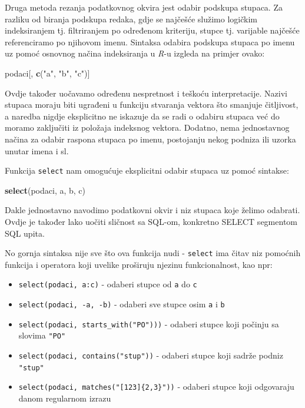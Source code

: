 \documentclass[]{book}
\newenvironment{Shaded}{\begin{snugshade}}{\end{snugshade}}
\newcommand{\KeywordTok}[1]{\textcolor[rgb]{0.13,0.29,0.53}{\textbf{#1}}}
\newcommand{\StringTok}[1]{\textcolor[rgb]{0.31,0.60,0.02}{#1}}
\newcommand{\NormalTok}[1]{#1}
\providecommand{\tightlist}{%
  \setlength{\itemsep}{0pt}\setlength{\parskip}{0pt}}
\theoremstyle{definition}
\theoremstyle{definition}
\theoremstyle{definition}
\theoremstyle{remark}
\begin{document}
Druga metoda rezanja podatkovnog okvira jest odabir podskupa stupaca. Za
razliku od biranja podskupa redaka, gdje se najčešće služimo logičkim
indeksiranjem tj. filtriranjem po određenom kriteriju, stupce tj.
varijable najčešće referenciramo po njihovom imenu. Sintaksa odabira
podskupa stupaca po imenu uz pomoć osnovnog načina indeksiranja u
\emph{R}-u izgleda na primjer ovako:

\begin{Shaded}
\begin{Highlighting}[]
\NormalTok{podaci[, }\KeywordTok{c}\NormalTok{(}\StringTok{"a"}\NormalTok{, }\StringTok{"b"}\NormalTok{, }\StringTok{"c"}\NormalTok{)]}
\end{Highlighting}
\end{Shaded}

Ovdje također uočavamo određenu nespretnost i teškoću interpretacije.
Nazivi stupaca moraju biti ugrađeni u funkciju stvaranja vektora što
smanjuje čitljivost, a naredba nigdje eksplicitno ne iskazuje da se radi
o odabiru stupaca već do moramo zaključiti iz položaja indeksnog
vektora. Dodatno, nema jednostavnog načina za odabir raspona stupaca po
imenu, postojanju nekog podniza ili uzorka unutar imena i sl.

Funkcija \texttt{select} nam omogućuje eksplicitni odabir stupaca uz
pomoć sintakse:

\begin{Shaded}
\begin{Highlighting}[]
\KeywordTok{select}\NormalTok{(podaci, a, b, c)}
\end{Highlighting}
\end{Shaded}

Dakle jednostavno navodimo podatkovni okvir i niz stupaca koje želimo
odabrati. Ovdje je također lako uočiti sličnost sa SQL-om, konkretno
SELECT segmentom SQL upita.

No gornja sintaksa nije sve što ova funkcija nudi - \texttt{select} ima
čitav niz pomoćnih funkcija i operatora koji uvelike proširuju njezinu
funkcionalnost, kao npr:

\begin{itemize}
\tightlist
\item
  \texttt{select(podaci,\ a:c)} - odaberi stupce od \texttt{a} do
  \texttt{c}
\item
  \texttt{select(podaci,\ -a,\ -b)} - odaberi sve stupce osim \texttt{a}
  i \texttt{b}
\item
  \texttt{select(podaci,\ starts\_with("PO")))} - odaberi stupce koji
  počinju sa slovima \texttt{"PO"}
\item
  \texttt{select(podaci,\ contains("stup"))} - odaberi stupce koji
  sadrže podniz \texttt{"stup"}
\item
  \texttt{select(podaci,\ matches("{[}123{]}\{2,3\}"))} - odaberi stupce
  koji odgovaraju danom regularnom izrazu
\end{itemize}
\end{document}
